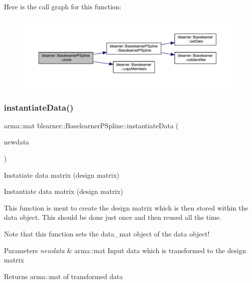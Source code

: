 Here is the call graph for this function\+:
\nopagebreak
\begin{figure}[H]
\begin{center}
\leavevmode
\includegraphics[width=350pt]{classblearner_1_1_baselearner_p_spline_aea7d3c0ef6d77ffb8a2fb2000fae6399_cgraph}
\end{center}
\end{figure}
\mbox{\label{classblearner_1_1_baselearner_p_spline_a1a83493d31e14f7e28d0aba40a3f4396}} 
\subsubsection{\texorpdfstring{instantiate\+Data()}{instantiateData()}}
{\footnotesize\ttfamily arma\+::mat blearner\+::\+Baselearner\+P\+Spline\+::instantiate\+Data (\begin{DoxyParamCaption}\item[{const arma\+::mat \&}]{newdata }\end{DoxyParamCaption})\hspace{0.3cm}{\ttfamily [virtual]}}



Instatiate data matrix (design matrix) 

Instantiate data matrix (design matrix)

This function is ment to create the design matrix which is then stored within the data object. This should be done just once and then reused all the time.

Note that this function sets the {\ttfamily data\+\_\+mat} object of the data object!


\begin{DoxyParams}{Parameters}
{\em newdata} & {\ttfamily arma\+::mat} Input data which is transformed to the design matrix\\
\hline
\end{DoxyParams}
\begin{DoxyReturn}{Returns}
{\ttfamily arma\+::mat} of transformed data 
\end{DoxyReturn}


